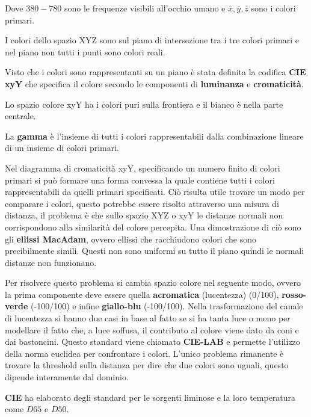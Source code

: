 Dove $380-780$ sono  le frequenze visibili all'occhio umano e $\overline{x},\overline{y},\overline{z}$
sono i colori primari.

I colori dello spazio XYZ sono sul piano di intersezione tra i tre colori primari
e nel piano non tutti i punti sono colori reali. 

Visto che i colori sono rappresentanti su un piano è stata definita la codifica 
\textbf{CIE xyY} che specifica il colore secondo le componenti di \textbf{luminanza} e \textbf{cromaticità}.

Lo spazio colore xyY ha i colori puri sulla frontiera e il bianco è nella parte 
centrale.

\begin{definizione}
    La \textbf{gamma} è l'insieme di tutti i colori rappresentabili dalla combinazione
    lineare di un insieme di colori primari.
\end{definizione}

Nel diagramma di cromaticità xyY, specificando un numero finito di colori primari
si può formare una forma convessa la quale contiene tutti i colori rappresentabili 
da quelli primari specificati. Ciò risulta utile trovare un modo per comparare i colori, questo potrebbe 
essere risolto attraverso una misura di distanza, il problema è che sullo spazio 
XYZ o xyY le distanze normali non corrispondono alla similarità del colore percepita. 
Una dimostrazione di ciò sono gli \textbf{ellissi MacAdam}, ovvero ellissi che 
racchiudono colori che sono precibilmente simili. Questi non sono uniformi su tutto il 
piano quindi le normali distanze non funzionano. 

Per risolvere questo problema si cambia spazio colore nel seguente modo, ovvero 
la prima componente deve essere quella \textbf{acromatica} (lucentezza) (0/100), \textbf{rosso-verde} (-100/100)
e infine \textbf{giallo-blu} (-100/100). Nella trasformazione del canale di lucentezza si hanno 
due casi in base al fatto se si ha tanta luce o meno per modellare il fatto che, 
a luce soffusa, il contributo al colore viene dato da coni e dai bastoncini. Questo 
standard viene chiamato \textbf{CIE-LAB} e permette l'utilizzo  della norma euclidea 
per confrontare i colori. L'unico problema rimanente è trovare la threshold sulla 
distanza per dire che due colori sono uguali, questo dipende interamente dal 
dominio.

\textbf{CIE} ha elaborato degli standard per le sorgenti liminose e la loro temperatura come $D65$ e $D50$.

